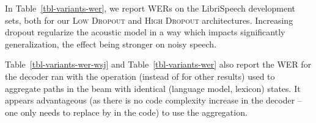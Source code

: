 \documentclass{article}
\begin{document}
\begin{table}
  \caption{Comparison in LER and WER of variants of our model on (a) WSJ
    and (b) LibriSpeech. LER is computed with \emph{no} decoding. Operator
     and  refer to the aggregation of beam hypotheses (see
    Section~\ref{sec-decoder}).    \vspace*{0.2cm}
  }
  \centering
  \hspace*{0.25cm}
  \hspace*{1cm}
\end{table}

In Table~\ref{tbl-variants-wer}, we report WERs on the LibriSpeech
development sets, both for our \textsc{Low Dropout} and \textsc{High
  Dropout} architectures. Increasing dropout regularize the acoustic model
in a way which impacts significantly generalization, the effect being
stronger on noisy speech.

Table~\ref{tbl-variants-wer-wsj} and Table~\ref{tbl-variants-wer} also
report the WER for the decoder ran with the  operation
(instead of  for other results) used to aggregate paths in
the beam with identical (language model, lexicon) states. It appears
advantageous (as there is no code complexity increase in the decoder -- one
only needs to replace  by  in the code) to use
the  aggregation.
\end{document}

